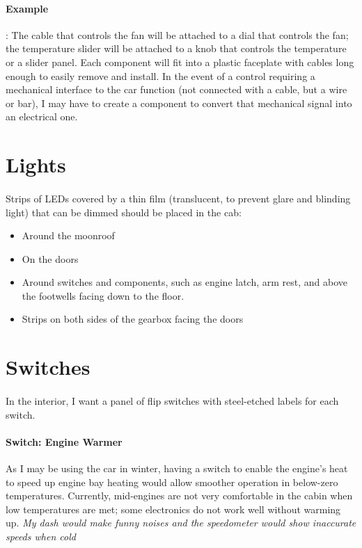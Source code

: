 \documentclass[a4paper,10pt]{report}
\begin{document}
\paragraph{Example}: The cable that controls the fan will be attached to a dial that controls the fan; the temperature slider will be attached to a knob that controls the temperature or a slider panel. Each component will fit into a plastic faceplate with cables long enough to easily remove and install. In the event of a control requiring a mechanical interface to the car function (not connected with a cable, but a wire or bar), I may have to create a component to convert that mechanical signal into an electrical one.
\section{Lights}
\paragraph*{}Strips of LEDs covered by a thin film (translucent, to prevent glare and blinding light) that can be dimmed should be placed in the cab: 
\begin{itemize}
 \item Around the moonroof
 \item On the doors
 \item Around switches and components, such as engine latch, arm rest, and above the footwells facing down to the floor.
 \item Strips on both sides of the gearbox facing the doors
\end{itemize}
\section{Switches}
\paragraph*{}In the interior, I want a panel of flip switches with steel-etched labels for each switch. 
\paragraph*{Switch: Engine Warmer}As I may be using the car in winter, having a switch to enable the engine's heat to speed up engine bay heating would allow smoother operation in below-zero temperatures. Currently, mid-engines are not very comfortable in the cabin when low temperatures are met; some electronics do not work well without warming up. \textit{My dash would make funny noises and the speedometer would show inaccurate speeds when cold}
\end{document}
